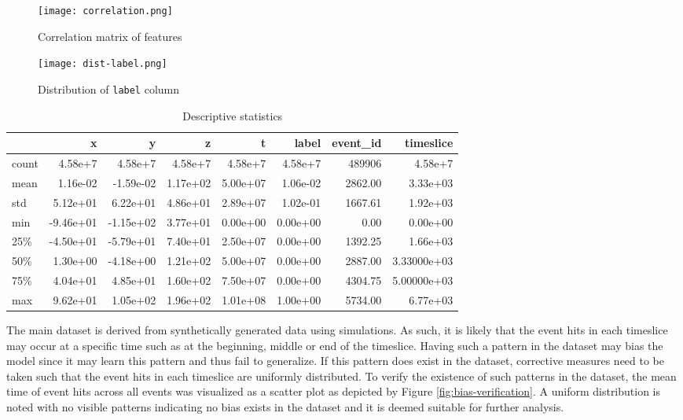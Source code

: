 \begin{figure}[htb]
  \begin{minipage}[t]{0.64\textwidth}
  \centering
  \texttt{[image: correlation.png]}
  \caption{Correlation matrix of features}
  \label{fig:corr}    
  \end{minipage}
  \begin{minipage}[t]{0.34\textwidth}
  \centering
  \texttt{[image: dist-label.png]}
  \caption{Distribution of \texttt{label} column}%
  \label{fig:dist-label}    
  \end{minipage}
\end{figure}

\begin{table}[htb]
  \centering
  \caption{Descriptive statistics}
  \label{tab:desc-stats}
  \begin{tabular}{lrrrrrrr}
    \hline
          & x & y & z & t & label & event\_id & timeslice \\
    \hline
    count & 4.58e+7 &  4.58e+7 &  4.58e+7 &  4.58e+7 &  4.58e+7 &  489906 &  4.58e+7 \\
    mean  & 1.16e-02 & -1.59e-02 &  1.17e+02 &  5.00e+07 &  1.06e-02 &    2862.00 &  3.33e+03 \\
    std   & 5.12e+01 &  6.22e+01 &  4.86e+01 &  2.89e+07 &  1.02e-01 &    1667.61 &  1.92e+03 \\
    min   & -9.46e+01 & -1.15e+02 &  3.77e+01 &  0.00e+00 &  0.00e+00 &       0.00 &  0.00e+00 \\
    25\%  & -4.50e+01 & -5.79e+01 &  7.40e+01 &  2.50e+07 &  0.00e+00 &    1392.25 &  1.66e+03 \\
    50\%  & 1.30e+00 & -4.18e+00 &  1.21e+02 &  5.00e+07 &  0.00e+00 &    2887.00 &  3.33000e+03 \\
    75\%  & 4.04e+01 &  4.85e+01 &  1.60e+02 &  7.50e+07 &  0.00e+00 &    4304.75 &  5.00000e+03 \\
    max  & 9.62e+01 &  1.05e+02 &  1.96e+02 &  1.01e+08 &  1.00e+00 &    5734.00 &  6.77e+03 \\
    \hline
  \end{tabular}
\end{table}

The main dataset is derived from synthetically generated data using
simulations. As such, it is likely that the event hits in each
timeslice may occur at a specific time such as at the beginning,
middle or end of the timeslice. Having such a pattern in the dataset
may bias the model since it may learn this pattern and thus fail to
generalize. If this pattern does exist in the dataset, corrective
measures need to be taken such that the event hits in each timeslice
are uniformly distributed. To verify the existence of such patterns in
the dataset, the mean time of event hits across all events was
visualized as a scatter plot as depicted by Figure
\ref{fig:bias-verification}. A uniform distribution is noted with no
visible patterns indicating no bias exists in the dataset and it is
deemed suitable for further analysis.

